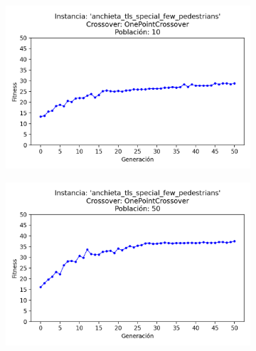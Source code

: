 \begin{figure}[h]
    \centering
    \begin{subfigure}[t]{.49\textwidth}
      \centering
      \includegraphics[width=\textwidth]{report/images/estudio/anchieta_tls_special_few_pedestrians-OnePointCrossover-10.png}
    \end{subfigure}
    \hfill
    \begin{subfigure}[t]{.49\textwidth}
      \centering
      \includegraphics[width=\textwidth]{report/images/estudio/anchieta_tls_special_few_pedestrians-OnePointCrossover-50.png}
    \end{subfigure}
    \vspace{0.7cm}
    \begin{subfigure}[t]{.49\textwidth}
      \centering

\end{subfigure}
\end{figure}
